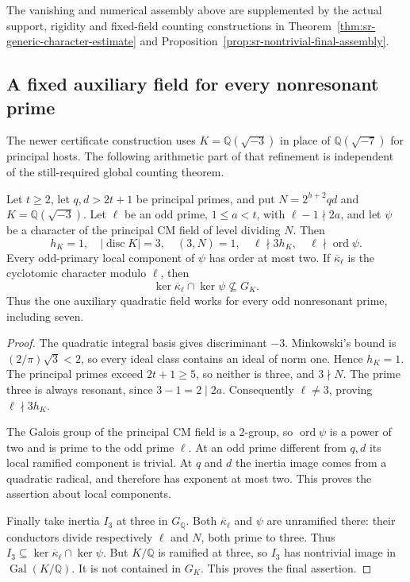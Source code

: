 The vanishing and numerical assembly above are supplemented by
the actual support, rigidity and fixed-field counting constructions
in Theorem~\ref{thm:sr-generic-character-estimate} and
Proposition~\ref{prop:sr-nontrivial-final-assembly}.


\subsection{A fixed auxiliary field for every nonresonant prime}
\label{sec:sr-three-auxiliary}
The newer certificate construction uses
\(K=\mathbb Q(\sqrt{-3})\) in place of
\(\mathbb Q(\sqrt{-7})\) for principal hosts.
The following arithmetic part of that refinement is independent of
the still-required global counting theorem.

\begin{srproposition}\label{prop:sr-three-auxiliary}
Let \(t\geq2\), let \(q,d>2t+1\) be principal primes, and put
\(N=2^{h+2}qd\) and \(K=\mathbb Q(\sqrt{-3})\).
Let \(\ell\) be an odd prime, \(1\leq a<t\), with
\(\ell-1\nmid2a\), and let \(\psi\) be a character of the
principal CM field of level dividing \(N\).
Then
\[
 h_K=1,\quad |\operatorname{disc}K|=3,\quad
 (3,N)=1,\quad \ell\nmid3h_K,\quad \ell\nmid\operatorname{ord}\psi .
\]
Every odd-primary local component of \(\psi\) has order at most two.
If \(\overline\kappa_\ell\) is the cyclotomic character modulo
\(\ell\), then
\[
 \ker\overline\kappa_\ell\cap\ker\psi
                              \not\subseteq G_K .
\]
Thus the one auxiliary quadratic field works for every odd
nonresonant prime, including seven.
\end{srproposition}
\begin{proof}
The quadratic integral basis gives discriminant \(-3\).
Minkowski's bound is \((2/\pi)\sqrt3<2\), so every ideal class
contains an ideal of norm one. Hence \(h_K=1\).
The principal primes exceed \(2t+1\geq5\), so neither is three,
and \(3\nmid N\).
The prime three is always resonant, since \(3-1=2\mid2a\).
Consequently \(\ell\ne3\), proving \(\ell\nmid3h_K\).

The Galois group of the principal CM field is a \(2\)-group,
so \(\operatorname{ord}\psi\) is a power of two and is prime to
the odd prime \(\ell\).
At an odd prime different from \(q,d\) its local ramified component
is trivial. At \(q\) and \(d\) the inertia image comes from a
quadratic radical, and therefore has exponent at most two.
This proves the assertion about local components.

Finally take inertia \(I_3\) at three in \(G_{\mathbb Q}\).
Both \(\overline\kappa_\ell\) and \(\psi\) are unramified there:
their conductors divide respectively \(\ell\) and \(N\), both
prime to three. Thus
\(I_3\subseteq\ker\overline\kappa_\ell\cap\ker\psi\).
But \(K/\mathbb Q\) is ramified at three, so \(I_3\) has
nontrivial image in \(\operatorname{Gal}(K/\mathbb Q)\).
It is not contained in \(G_K\). This proves the final assertion.
\end{proof}

